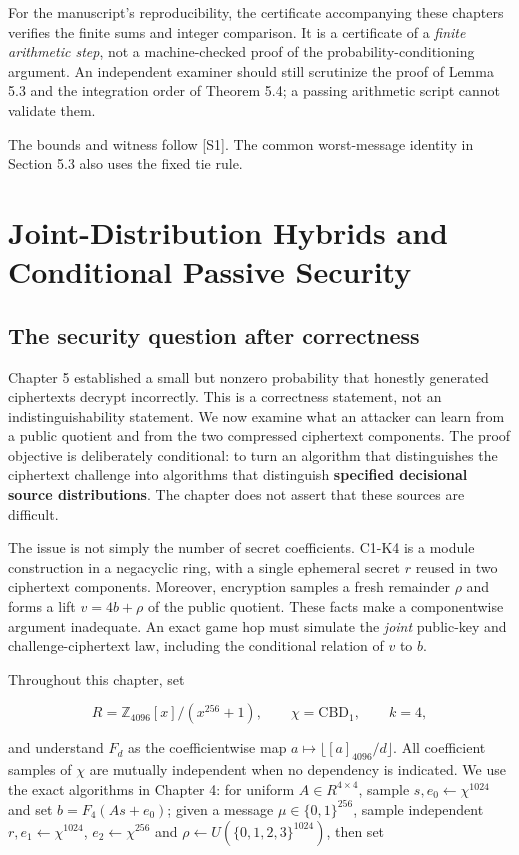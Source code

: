 \documentclass[
  11pt,
  a4paper,
  oneside]{report}
\begin{document}
For the manuscript's reproducibility, the certificate accompanying these
chapters verifies the finite sums and integer comparison. It is a
certificate of a \emph{finite arithmetic step}, not a machine-checked
proof of the probability-conditioning argument. An independent examiner
should still scrutinize the proof of Lemma 5.3 and the integration order
of Theorem 5.4; a passing arithmetic script cannot validate them.

The bounds and witness follow {[}S1{]}. The common worst-message
identity in Section 5.3 also uses the fixed tie rule.

\chapter{Joint-Distribution Hybrids and Conditional Passive
Security}\label{joint-distribution-hybrids-and-conditional-passive-security}

\section{The security question after
correctness}\label{the-security-question-after-correctness}

Chapter 5 established a small but nonzero probability that honestly
generated ciphertexts decrypt incorrectly. This is a correctness
statement, not an indistinguishability statement. We now examine what an
attacker can learn from a public quotient and from the two compressed
ciphertext components. The proof objective is deliberately conditional:
to turn an algorithm that distinguishes the ciphertext challenge into
algorithms that distinguish \textbf{specified decisional source
distributions}. The chapter does not assert that these sources are
difficult.

The issue is not simply the number of secret coefficients. C1-K4 is a
module construction in a negacyclic ring, with a single ephemeral secret
\(r\) reused in two ciphertext components. Moreover, encryption samples
a fresh remainder \(\rho\) and forms a lift \(v=4b+\rho\) of the public
quotient. These facts make a componentwise argument inadequate. An exact
game hop must simulate the \emph{joint} public-key and
challenge-ciphertext law, including the conditional relation of \(v\) to
\(b\).

Throughout this chapter, set

\[
R=\mathbb Z_{4096}[x]/(x^{256}+1),\qquad
\chi=\mathrm{CBD}_1,\qquad k=4,
\]

and understand \(F_d\) as the coefficientwise map
\(a\mapsto\lfloor[a]_{4096}/d\rfloor\). All coefficient samples of
\(\chi\) are mutually independent when no dependency is indicated. We
use the exact algorithms in Chapter 4: for uniform
\(A\in R^{4\times4}\), sample \(s,e_0\leftarrow\chi^{1024}\) and set
\(b=F_4(As+e_0)\); given a message \(\mu\in\{0,1\}^{256}\), sample
independent \(r,e_1\leftarrow\chi^{1024}\), \(e_2\leftarrow\chi^{256}\)
and \(\rho\leftarrow U(\{0,1,2,3\}^{1024})\), then set
\end{document}
